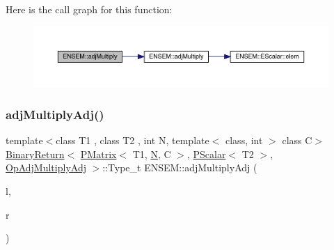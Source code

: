 Here is the call graph for this function\+:\nopagebreak
\begin{figure}[H]
\begin{center}
\leavevmode
\includegraphics[width=350pt]{df/d0a/group__primmatrix_gac28cbe7440b96e5650ac2c201b8c5ac2_cgraph}
\end{center}
\end{figure}
\mbox{\label{group__primmatrix_gada4da32758440b83d445ae4a0e14297e}} 
\subsubsection{\texorpdfstring{adjMultiplyAdj()}{adjMultiplyAdj()}\hspace{0.1cm}{\footnotesize\ttfamily [1/3]}}
{\footnotesize\ttfamily template$<$class T1 , class T2 , int N, template$<$ class, int $>$ class C$>$ \\
\mbox{\hyperlink{structENSEM_1_1BinaryReturn}{Binary\+Return}}$<$ \mbox{\hyperlink{classENSEM_1_1PMatrix}{P\+Matrix}}$<$ T1, \mbox{\hyperlink{adat__devel_2lib_2hadron_2operator__name__util_8cc_a7722c8ecbb62d99aee7ce68b1752f337}{N}}, C $>$, \mbox{\hyperlink{classENSEM_1_1PScalar}{P\+Scalar}}$<$ T2 $>$, \mbox{\hyperlink{structENSEM_1_1OpAdjMultiplyAdj}{Op\+Adj\+Multiply\+Adj}} $>$\+::Type\+\_\+t E\+N\+S\+E\+M\+::adj\+Multiply\+Adj (\begin{DoxyParamCaption}\item[{const \mbox{\hyperlink{classENSEM_1_1PMatrix}{P\+Matrix}}$<$ T1, \mbox{\hyperlink{adat__devel_2lib_2hadron_2operator__name__util_8cc_a7722c8ecbb62d99aee7ce68b1752f337}{N}}, C $>$ \&}]{l,  }\item[{const \mbox{\hyperlink{classENSEM_1_1PScalar}{P\+Scalar}}$<$ T2 $>$ \&}]{r }\end{DoxyParamCaption})\hspace{0.3cm}{\ttfamily [inline]}}

